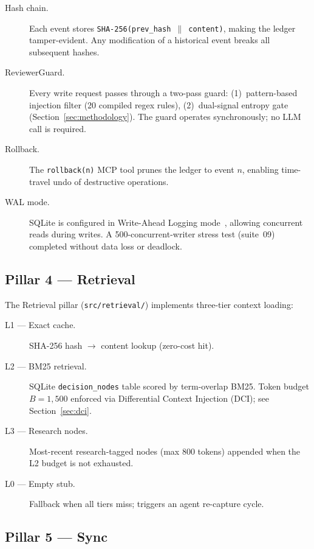 \documentclass[11pt]{article}
\begin{document}
\begin{description}
  \item[Hash chain.] Each event stores \texttt{SHA-256(prev\_hash
    $\|$ content)}, making the ledger tamper-evident. Any modification
    of a historical event breaks all subsequent hashes.
  \item[ReviewerGuard.] Every write request passes through a two-pass
    guard: (1)~pattern-based injection filter (20 compiled regex rules),
    (2)~dual-signal entropy gate (Section~\ref{sec:methodology}).
    The guard operates synchronously; no LLM call is required.
  \item[Rollback.] The \texttt{rollback(n)} MCP tool prunes the ledger
    to event $n$, enabling time-travel undo of destructive operations.
  \item[WAL mode.] SQLite is configured in Write-Ahead Logging
    mode~\cite{hipp2020sqlite}, allowing concurrent reads during writes.
    A 500-concurrent-writer stress test (suite~09) completed without
    data loss or deadlock.
\end{description}

\subsection{Pillar 4 --- Retrieval}
\label{sec:retrieval}

The Retrieval pillar (\texttt{src/retrieval/}) implements three-tier context
loading:

\begin{description}
  \item[L1 --- Exact cache.] SHA-256 hash $\to$ content lookup (zero-cost hit).
  \item[L2 --- BM25 retrieval.] SQLite \texttt{decision\_nodes} table scored
    by term-overlap BM25. Token budget $B = 1{,}500$ enforced via
    Differential Context Injection (DCI); see Section~\ref{sec:dci}.
  \item[L3 --- Research nodes.] Most-recent research-tagged nodes (max
    800 tokens) appended when the L2 budget is not exhausted.
  \item[L0 --- Empty stub.] Fallback when all tiers miss; triggers an
    agent re-capture cycle.
\end{description}

\subsection{Pillar 5 --- Sync}
\label{sec:sync}
\end{document}
